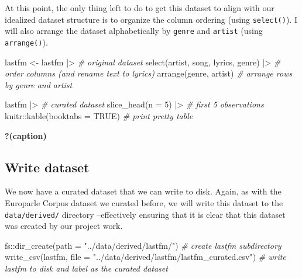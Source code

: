 \documentclass[
  letterpaper,
  DIV=11,
  numbers=noendperiod]{scrreport}
\newenvironment{Shaded}{\begin{snugshade}}{\end{snugshade}}
\newcommand{\AttributeTok}[1]{\textcolor[rgb]{0.00,0.00,0.00}{#1}}
\newcommand{\CommentTok}[1]{\textcolor[rgb]{0.00,0.00,0.00}{\textit{#1}}}
\newcommand{\ConstantTok}[1]{\textcolor[rgb]{0.00,0.00,0.00}{#1}}
\newcommand{\DecValTok}[1]{\textcolor[rgb]{0.00,0.00,0.00}{#1}}
\newcommand{\FunctionTok}[1]{\textcolor[rgb]{0.00,0.00,0.00}{#1}}
\newcommand{\NormalTok}[1]{\textcolor[rgb]{0.00,0.00,0.00}{#1}}
\newcommand{\OtherTok}[1]{\textcolor[rgb]{0.00,0.00,0.00}{#1}}
\newcommand{\SpecialCharTok}[1]{\textcolor[rgb]{0.00,0.00,0.00}{#1}}
\newcommand{\StringTok}[1]{\textcolor[rgb]{0.00,0.00,0.00}{#1}}
\theoremstyle{definition}
\theoremstyle{remark}
\begin{document}
At this point, the only thing left to do to get this dataset to align
with our idealized dataset structure is to organize the column ordering
(using \texttt{select()}). I will also arrange the dataset
alphabetically by \texttt{genre} and \texttt{artist} (using
\texttt{arrange()}).

\begin{Shaded}
\begin{Highlighting}[]
\NormalTok{lastfm }\OtherTok{\textless{}{-}} 
\NormalTok{  lastfm }\SpecialCharTok{|\textgreater{}} \CommentTok{\# original dataset}
  \FunctionTok{select}\NormalTok{(artist, song, lyrics, genre) }\SpecialCharTok{|\textgreater{}} \CommentTok{\# order columns (and rename \textasciigrave{}text\textasciigrave{} to \textasciigrave{}lyrics\textasciigrave{})}
  \FunctionTok{arrange}\NormalTok{(genre, artist) }\CommentTok{\# arrange rows by \textasciigrave{}genre\textasciigrave{} and \textasciigrave{}artist\textasciigrave{}}

\NormalTok{lastfm }\SpecialCharTok{|\textgreater{}} \CommentTok{\# curated dataset}
  \FunctionTok{slice\_head}\NormalTok{(}\AttributeTok{n =} \DecValTok{5}\NormalTok{) }\SpecialCharTok{|\textgreater{}} \CommentTok{\# first 5 observations}
\NormalTok{  knitr}\SpecialCharTok{::}\FunctionTok{kable}\NormalTok{(}\AttributeTok{booktabs =} \ConstantTok{TRUE}\NormalTok{) }\CommentTok{\# print pretty table}
\end{Highlighting}
\end{Shaded}

\begin{table}

\caption{\textbf{?(caption)}}

\end{table}

\hypertarget{write-dataset-1}{%
\subsection{Write dataset}\label{write-dataset-1}}

We now have a curated dataset that we can write to disk. Again, as with
the Europarle Corpus dataset we curated before, we will write this
dataset to the \texttt{data/derived/} directory --effectively ensuring
that it is clear that this dataset was created by our project work.

\begin{Shaded}
\begin{Highlighting}[]
\NormalTok{fs}\SpecialCharTok{::}\FunctionTok{dir\_create}\NormalTok{(}\AttributeTok{path =} \StringTok{"../data/derived/lastfm/"}\NormalTok{) }\CommentTok{\# create lastfm subdirectory}
\FunctionTok{write\_csv}\NormalTok{(lastfm, }
          \AttributeTok{file =} \StringTok{"../data/derived/lastfm/lastfm\_curated.csv"}\NormalTok{) }\CommentTok{\# write lastfm to disk and label as the curated dataset}
\end{Highlighting}
\end{Shaded}
\end{document}
